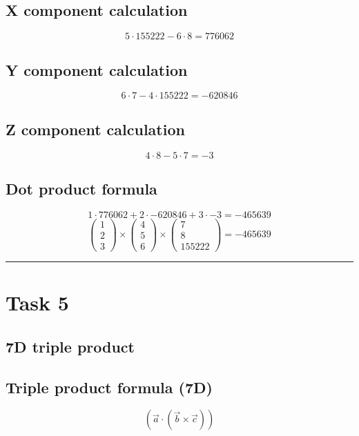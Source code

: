 \documentclass{article}
\begin{document}
\subsection*{ \vspace{1em} X component calculation}
\[
5 \cdot 155222 - 6 \cdot 8 = 776062
\]
\subsection*{ \vspace{1em} Y component calculation}
\[
6 \cdot 7 - 4 \cdot 155222 = -620846
\]
\subsection*{ \vspace{1em} Z component calculation}
\[
4 \cdot 8 - 5 \cdot 7 = -3
\]
\subsection*{ \vspace{1em} Dot product formula}
\[
1 \cdot 776062 + 2 \cdot -620846 + 3 \cdot -3 = -465639
\]
\[
\begin{pmatrix}1 \\ 2 \\ 3\end{pmatrix} \times \begin{pmatrix}4 \\ 5 \\ 6\end{pmatrix} \times \begin{pmatrix}7 \\ 8 \\ 155222\end{pmatrix} = -465639
\]
\vspace{1em}
\hrule
\vspace{1em}
\section*{Task 5}

\subsection*{7D triple product}
\subsection*{ \vspace{1em} Triple product formula (7D)}
\[
(\vec{a} \cdot (\vec{b} \times \vec{c}))
\]
\end{document}
